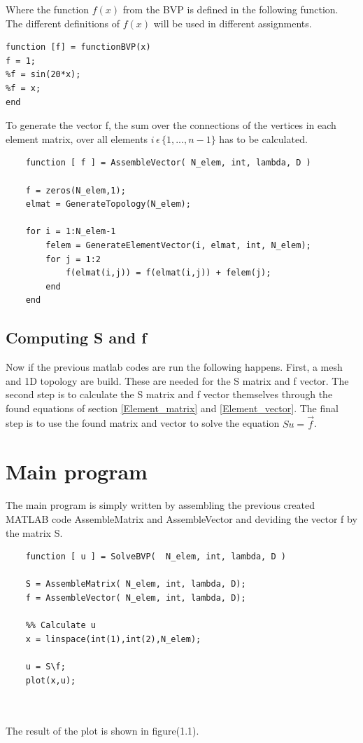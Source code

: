 \documentclass[a4paper]{report}
\begin{document}
Where the function $f(x)$ from the BVP is defined in the following function. The different definitions of $f(x)$ will be used in different assignments.

\begin{lstlisting}
function [f] = functionBVP(x)
f = 1;
%f = sin(20*x);
%f = x;
end
\end{lstlisting}

\smallskip

To generate the vector f, the sum over the connections of the vertices in each element matrix, over all elements $i\,\epsilon\, \{1,...,n-1\}$  has to be calculated. 

\bigskip

	
\begin{lstlisting}
	function [ f ] = AssembleVector( N_elem, int, lambda, D )
		
	f = zeros(N_elem,1);
	elmat = GenerateTopology(N_elem);
		
	for i = 1:N_elem-1
		felem = GenerateElementVector(i, elmat, int, N_elem);
		for j = 1:2
			f(elmat(i,j)) = f(elmat(i,j)) + felem(j);
		end
	end
\end{lstlisting}	




\subsection{Computing S and f}

Now if the previous matlab codes are run the following happens. First, a mesh and 1D topology are build. These are needed for the S matrix and f vector. The second step is to calculate the S matrix and f vector themselves through the found equations of section \ref{Element_matrix} and \ref{Element_vector}. The final step is to use the found matrix and vector to solve the equation $Su=\vec{f}$.





\section{Main program}

The main program is simply written by assembling the previous created MATLAB code AssembleMatrix and AssembleVector and deviding the vector f by the matrix S.
\begin{lstlisting}
	function [ u ] = SolveBVP(  N_elem, int, lambda, D )
	
	S = AssembleMatrix( N_elem, int, lambda, D);
	f = AssembleVector( N_elem, int, lambda, D);
	
	%% Calculate u
	x = linspace(int(1),int(2),N_elem);
	
	u = S\f;
	plot(x,u); 
	
	
\end{lstlisting}
The result of the plot is shown in figure(1.1).
\end{document}
